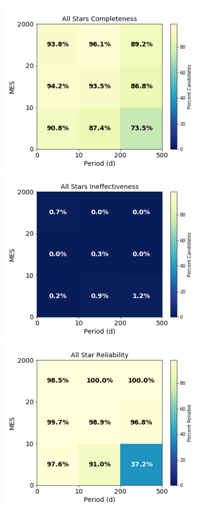 \begin{figure}[h!]
\begin{center}
\includegraphics[width=0.93\linewidth]{fig-AllCompletePmes.png}
\includegraphics[width=0.93\linewidth]{fig-AllEffect-Pmes.png}
\includegraphics[width=0.93\linewidth]{fig-AllReliabilityPmes.png}

\end{center}
\end{figure}
